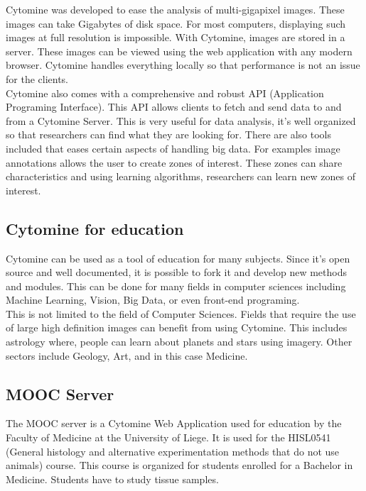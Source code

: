 \documentclass[a4paper,11pt]{report}
\numberwithin{figure}{section} %
\begin{document}
Cytomine was developed to ease the analysis of multi-gigapixel images.
These images can take Gigabytes of disk space.
For most computers, displaying such images at full resolution is impossible.
With Cytomine, images are stored in a server.
These images can be viewed using the web application with any modern browser.
Cytomine handles everything locally so that performance is not an issue for the clients.\\

	Cytomine also comes with a comprehensive and robust API (Application Programing Interface).
	This API allows clients to fetch and send data to and from a Cytomine Server.
	This is very useful for data analysis, it's well organized so that researchers can find what they are looking for.
	There are also tools included that eases certain aspects of handling big data.
	For examples image annotations allows the user to create zones of interest.
	These zones can share characteristics and using learning algorithms, researchers can learn new zones of interest.

\subsection{Cytomine for education}

Cytomine can be used as a tool of education for many subjects.
Since it's open source and well documented, it is possible to fork it and develop new methods and modules.
This can be done for many fields in computer sciences including Machine Learning, Vision, Big Data, or even front-end programing.\\

This is not limited to the field of Computer Sciences.
Fields that require the use of large high definition images can benefit from using Cytomine.
This includes astrology where, people can learn about planets and stars using imagery.
Other sectors include Geology, Art, and in this case Medicine.


\subsection{MOOC Server}

The MOOC server is a Cytomine Web Application used for education by the Faculty of Medicine at the University of Liege.
It is used for the HISL0541 (General histology and alternative experimentation methods that do not use animals) course.
This course is organized for students enrolled for a Bachelor in Medicine.
Students have to study tissue samples. \\
\end{document}
